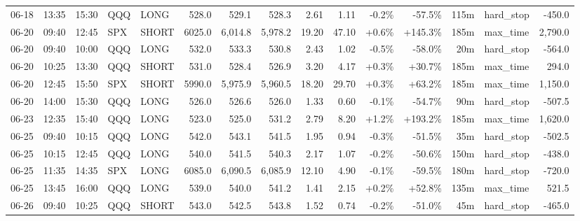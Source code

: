 \documentclass[11pt,a4paper,twoside]{article}
\begin{document}
\begin{landscape}
\begin{center}
\begin{longtable}{>{\color{txtmain}}l l l l l r r r r r r r r >{\color{txtmain}}l r}
06-18 & 13:35 & 15:30 & QQQ & LONG & 528.0 & 529.1 & 528.3 & 2.61 & 1.11 & \textcolor{lossred}{-0.2\%} & \textcolor{lossred}{-57.5\%} & 115m & hard\_stop & \textcolor{lossred}{-450.0} \\
06-20 & 09:40 & 12:45 & SPX & SHORT & 6025.0 & 6,014.8 & 5,978.2 & 19.20 & 47.10 & \textcolor{wingreen}{+0.6\%} & \textcolor{wingreen}{+145.3\%} & 185m & max\_time & \textcolor{wingreen}{2,790.0} \\
06-20 & 09:40 & 10:00 & QQQ & LONG & 532.0 & 533.3 & 530.8 & 2.43 & 1.02 & \textcolor{lossred}{-0.5\%} & \textcolor{lossred}{-58.0\%} & 20m & hard\_stop & \textcolor{lossred}{-564.0} \\
06-20 & 10:25 & 13:30 & QQQ & SHORT & 531.0 & 528.4 & 526.9 & 3.20 & 4.17 & \textcolor{wingreen}{+0.3\%} & \textcolor{wingreen}{+30.7\%} & 185m & max\_time & \textcolor{wingreen}{294.0} \\
06-20 & 12:45 & 15:50 & SPX & SHORT & 5990.0 & 5,975.9 & 5,960.5 & 18.20 & 29.70 & \textcolor{wingreen}{+0.3\%} & \textcolor{wingreen}{+63.2\%} & 185m & max\_time & \textcolor{wingreen}{1,150.0} \\
06-20 & 14:00 & 15:30 & QQQ & LONG & 526.0 & 526.6 & 526.0 & 1.33 & 0.60 & \textcolor{lossred}{-0.1\%} & \textcolor{lossred}{-54.7\%} & 90m & hard\_stop & \textcolor{lossred}{-507.5} \\
06-23 & 12:35 & 15:40 & QQQ & LONG & 523.0 & 525.0 & 531.2 & 2.79 & 8.20 & \textcolor{wingreen}{+1.2\%} & \textcolor{wingreen}{+193.2\%} & 185m & max\_time & \textcolor{wingreen}{1,620.0} \\
06-25 & 09:40 & 10:15 & QQQ & LONG & 542.0 & 543.1 & 541.5 & 1.95 & 0.94 & \textcolor{lossred}{-0.3\%} & \textcolor{lossred}{-51.5\%} & 35m & hard\_stop & \textcolor{lossred}{-502.5} \\
06-25 & 10:15 & 12:45 & QQQ & LONG & 540.0 & 541.5 & 540.3 & 2.17 & 1.07 & \textcolor{lossred}{-0.2\%} & \textcolor{lossred}{-50.6\%} & 150m & hard\_stop & \textcolor{lossred}{-438.0} \\
06-25 & 11:35 & 14:35 & SPX & LONG & 6085.0 & 6,090.5 & 6,085.9 & 12.10 & 4.90 & \textcolor{lossred}{-0.1\%} & \textcolor{lossred}{-59.5\%} & 180m & hard\_stop & \textcolor{lossred}{-720.0} \\
06-25 & 13:45 & 16:00 & QQQ & LONG & 539.0 & 540.0 & 541.2 & 1.41 & 2.15 & \textcolor{wingreen}{+0.2\%} & \textcolor{wingreen}{+52.8\%} & 135m & max\_time & \textcolor{wingreen}{521.5} \\
06-26 & 09:40 & 10:25 & QQQ & SHORT & 543.0 & 542.5 & 543.8 & 1.52 & 0.74 & \textcolor{lossred}{-0.2\%} & \textcolor{lossred}{-51.0\%} & 45m & hard\_stop & \textcolor{lossred}{-465.0} \\

\end{longtable}
\end{center}
\end{landscape}
\end{document}
